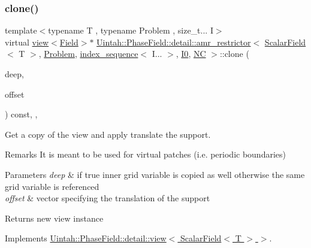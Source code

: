 \subsubsection{\texorpdfstring{clone()}{clone()}\hspace{0.1cm}{\footnotesize\ttfamily [2/2]}}
{\footnotesize\ttfamily template$<$typename T , typename Problem , size\+\_\+t... I$>$ \\
virtual \hyperlink{classUintah_1_1PhaseField_1_1detail_1_1view}{view}$<$\hyperlink{structUintah_1_1PhaseField_1_1ScalarField}{Field}$>$$\ast$ \hyperlink{classUintah_1_1PhaseField_1_1detail_1_1amr__restrictor}{Uintah\+::\+Phase\+Field\+::detail\+::amr\+\_\+restrictor}$<$ \hyperlink{structUintah_1_1PhaseField_1_1ScalarField}{Scalar\+Field}$<$ T $>$, \hyperlink{classUintah_1_1PhaseField_1_1Problem}{Problem}, \hyperlink{namespaceUintah_1_1PhaseField_a237de804d99512e50613aff7c94a9461}{index\+\_\+sequence}$<$ I... $>$, \hyperlink{namespaceUintah_1_1PhaseField_a547ce3002aa97fbd3ef3192a6eec8406abdd8ebcbdfd71d1125937e3012dc45fb}{I0}, \hyperlink{namespaceUintah_1_1PhaseField_a33d355affda78a83f45755ba8388cedda77924170fe82bfd58b74ca3e44139718}{NC} $>$\+::clone (\begin{DoxyParamCaption}\item[{bool}]{deep,  }\item[{const Int\+Vector \&}]{offset }\end{DoxyParamCaption}) const\hspace{0.3cm}{\ttfamily [inline]}, {\ttfamily [override]}, {\ttfamily [virtual]}}



Get a copy of the view and apply translate the support. 

\begin{DoxyRemark}{Remarks}
It is meant to be used for virtual patches (i.\+e. periodic boundaries)
\end{DoxyRemark}

\begin{DoxyParams}{Parameters}
{\em deep} & if true inner grid variable is copied as well otherwise the same grid variable is referenced \\
\hline
{\em offset} & vector specifying the translation of the support \\
\hline
\end{DoxyParams}
\begin{DoxyReturn}{Returns}
new view instance 
\end{DoxyReturn}


Implements \hyperlink{classUintah_1_1PhaseField_1_1detail_1_1view_3_01ScalarField_3_01T_01_4_01_4_abd928104240e329f3bc4441ebab7c50c}{Uintah\+::\+Phase\+Field\+::detail\+::view$<$ Scalar\+Field$<$ T $>$ $>$}.

